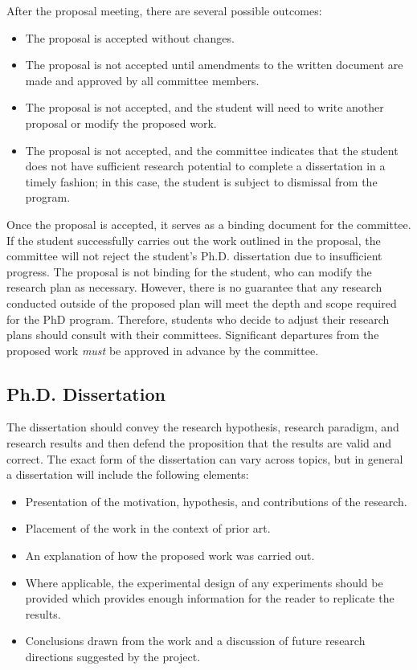 After the proposal meeting, there are several possible outcomes:

\begin{itemize}[nosep]
\item
  The proposal is accepted without changes.
\item
  The proposal is not accepted until amendments to the written document
  are made and approved by all committee members.
\item
  The proposal is not accepted, and the student will need to write
  another proposal or modify the proposed work.
\item
  The proposal is not accepted, and the committee indicates that the
  student does not have sufficient research potential to complete a
  dissertation in a timely fashion; in this case, the student is subject
  to dismissal from the program.
\end{itemize}

Once the proposal is accepted, it serves as a binding document for the committee. If the student successfully carries out the work outlined in the proposal, the committee will not reject the student's Ph.D. dissertation due to insufficient progress. The proposal is not binding for the student, who can modify the research plan as necessary. However, there is no guarantee that any research conducted outside of the proposed plan will meet the depth and scope required for the PhD program. Therefore, students who decide to adjust their research plans should consult with their committees.
Significant departures from the proposed work \emph{must} be approved in
advance by the committee.

\hypertarget{phd-dissertation}{
\subsection{Ph.D. Dissertation}
\label{phd-dissertation}
}

The dissertation should convey the research hypothesis, research
paradigm, and research results and then defend the proposition that the
results are valid and correct. The exact form of the dissertation can
vary across topics, but in general a dissertation will include the
following elements:

\begin{itemize}[nosep]
\item
  Presentation of the motivation, hypothesis, and contributions of the
  research.
\item
  Placement of the work in the context of prior art.
\item
  An explanation of how the proposed work was carried out.
\item
  Where applicable, the experimental design of any experiments should be
  provided which provides enough information for the reader to replicate
  the results.
\item
  Conclusions drawn from the work and a discussion of future research
  directions suggested by the project.
\end{itemize}

